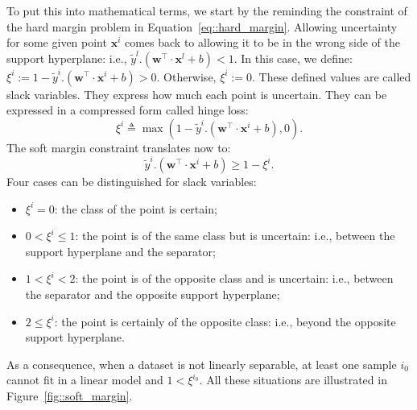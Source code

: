         To put this into mathematical terms, we start by the reminding the constraint of the hard margin problem in Equation~\ref{eq::hard_margin}.
        Allowing uncertainty for some given point $\bm{x}^i$ comes back to allowing it to be in the wrong side of the support hyperplane: i.e., $\tilde{y}^l.(\bm{w}^\intercal\cdot\bm{x}^l + b) < 1$.
        In this case, we define: $\xi^i := 1 - \tilde{y}^i.(\bm{w}^\intercal\cdot\bm{x}^i + b) > 0$.
        Otherwise, $\xi^i := 0$.
        These defined values are called slack variables.
        They express how much each point is uncertain.
        They can be expressed in a compressed form called hinge loss:
        \begin{equation}
            \label{eq::slack_variables}
            \xi^i \triangleq \max\left(1 - \tilde{y}^i.(\bm{w}^\intercal\cdot\bm{x}^i + b), 0\right).
        \end{equation}
        The soft margin constraint translates now to:
        \begin{equation}
            \label{eq::soft_margin}
            \tilde{y}^i.(\bm{w}^\intercal\cdot\bm{x}^i + b) \geq 1 - \xi^i.
        \end{equation}
        Four cases can be distinguished for slack variables:
        \begin{itemize}[label=\(\blacktriangleright\)]
            \item \(\xi^i = 0\): the class of the point is certain;
            \item \(0 < \xi^i \leq 1\): the point is of the same class but is uncertain: i.e., between the support hyperplane and the separator;
            \item \(1 < \xi^i < 2\): the point is of the opposite class and is uncertain: i.e., between the separator and the opposite support hyperplane;
            \item \(2 \leq \xi^i\): the point is certainly of the opposite class: i.e., beyond the opposite support hyperplane.
        \end{itemize}
        As a consequence, when a dataset is not linearly separable, at least one sample $i_0$ cannot fit in a linear model and $1 < \xi^{i_0}$.
        All these situations are illustrated in Figure~\ref{fig::soft_margin}.\\

